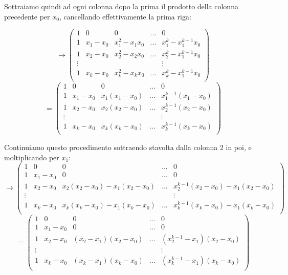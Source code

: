 \documentclass[a4paper,11pt]{article}
\begin{document}
Sottraiamo quindi ad ogni colonna dopo la prima il prodotto della colonna precedente per $x_0$, cancellando effettivamente la prima riga:

$$
\rightarrow
\begin{pmatrix}
	1 & 0 & 0 & ... & 0 \\
	1 & x_1 - x_0 & x_1^2 - x_1x_0 & ... & x_1^k - x_1^{k - 1} x_0 \\
	1 & x_2 - x_0 & x_2^2 - x_2x_0 & ... & x_2^k - x_1^{k - 1} x_0 \\
	\vdots & & & & \vdots \\
	1 & x_k - x_0 & x_k^2 - x_k x_0 & ... & x_k^k - x_1^{k - 1} x_0 \\
\end{pmatrix}
$$
$$
=
\begin{pmatrix}
	1 & 0 & 0 & ... & 0 \\
	1 & x_1 - x_0 & x_1(x_1 - x_0) & ... & x_1^{k - 1} (x_1 - x_0) \\
	1 & x_2 - x_0 & x_2(x_2 - x_0) & ... & x_2^{k - 1} (x_2 - x_0) \\
	\vdots & & & & \vdots \\
	1 & x_k - x_0 & x_k(x_k - x_0) & ... & x_k^{k - 1} (x_k - x_0) \\
\end{pmatrix}
$$

Continuiamo questo procedimento sottraendo stavolta dalla colonna 2 in poi, e moltiplicando per $x_1$:
$$
\rightarrow
\begin{pmatrix}
	1 & 0 & 0 & ... & 0 \\
	1 & x_1 - x_0 & 0  & ... & 0 \\
	1 & x_2 - x_0 & x_2(x_2 - x_0) - x_1(x_2 - x_0) & ... & x_2^{k - 1} (x_2 - x_0) - x_1 (x_2 - x_0) \\
	\vdots & & & & \vdots \\
	1 & x_k - x_0 & x_k(x_k - x_0) - x_1 (x_k - x_0) & ... & x_k^{k - 1} (x_k - x_0) - x_1 (x_k - x_0) \\
\end{pmatrix}
$$
$$
=
\begin{pmatrix}
	1 & 0 & 0 & ... & 0 \\
	1 & x_1 - x_0 & 0 & ... & 0 \\
	1 & x_2 - x_0 & (x_2 - x_1)(x_2 - x_0) & ... & (x_2^{k - 1} - x_1) (x_2 - x_0) \\
	\vdots & & & & \vdots \\
	1 & x_k - x_0 & (x_k - x_1) (x_k - x_0) & ... & (x_k^{k - 1} - x_1) (x_k - x_0) \\
\end{pmatrix}
$$
\end{document}
